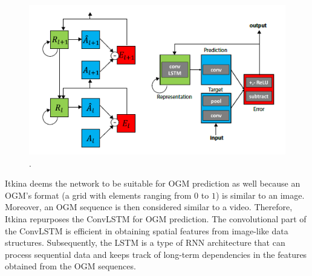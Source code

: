 \begin{figure}[h]
	\centering
	\includegraphics[width=0.8\linewidth]{Figures/Methods/PredNet_architecture}
	\caption{ \cite{lotter2016deep}.}
	\label{fig:PredNet_architecture}
\end{figure}

Itkina \cite{itkina2019dynamic} deems the network to be suitable for \gls{OGM} prediction as well because an \gls{OGM}'s format (a grid with elements ranging from $0$ to $1$) is similar to an image. Moreover, an \gls{OGM} sequence is then considered similar to a video. Therefore, Itkina \cite{itkina2019dynamic} repurposes the \gls{ConvLSTM} \cite{shi2015convolutional} for \gls{OGM} prediction. The convolutional part of the \gls{ConvLSTM} is efficient in obtaining spatial features from image-like data structures. Subsequently, the \gls{LSTM} \cite{hochreiter1997long} is a type of \gls{RNN} architecture that can process sequential data and keeps track of long-term dependencies in the features obtained from the \gls{OGM} sequences. \\

